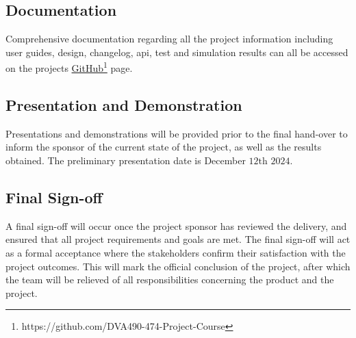
\subsection{Documentation}

Comprehensive documentation regarding all the project information including user guides, design, changelog, \ac{api}, test and simulation results can all be accessed on the projects \href{https://github.com/DVA490-474-Project-Course}{GitHub}\footnote{https://github.com/DVA490-474-Project-Course} page.



\subsection{Presentation and Demonstration}

Presentations and demonstrations will be provided prior to the final hand-over to inform the sponsor of the current state of the project, as well as the results obtained. The preliminary presentation date is December $12\text{th}$ $2024$.



\subsection{Final Sign-off}

A final sign-off will occur once the project sponsor has reviewed the delivery, and ensured that all project requirements and goals are met.
The final sign-off will act as a formal acceptance where the stakeholders confirm their satisfaction with the project outcomes. This will mark the official conclusion of the project, after which the team will be relieved of all responsibilities concerning the product and the project.


